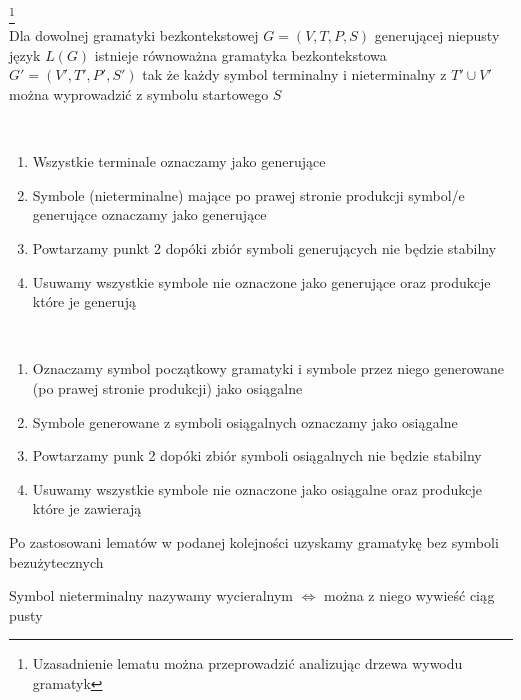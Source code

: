	\begin{lemat}\footnote{Uzasadnienie lematu można przeprowadzić analizując drzewa wywodu gramatyk}~\\
		Dla dowolnej gramatyki bezkontekstowej $G = (V, T, P, S)$ generującej niepusty język $L(G)$ istnieje równoważna gramatyka
		bezkontekstowa $G' = (V', T', P', S')$ tak że każdy symbol terminalny i nieterminalny z $T' \cup V'$ można wyprowadzić
		z  symbolu startowego $S$
	\end{lemat}		
	
	\begin{alg}~\\
		\begin{enumerate}
			\item Wszystkie terminale oznaczamy jako generujące
			\item Symbole (nieterminalne) mające po prawej stronie produkcji symbol/e generujące oznaczamy jako generujące
			\item Powtarzamy punkt 2 dopóki zbiór symboli generujących nie będzie stabilny
			\item Usuwamy wszystkie symbole nie oznaczone jako generujące oraz produkcje które je generują
		\end{enumerate}
	\end{alg}
	
	\begin{alg}~\\
		\begin{enumerate}
			\item Oznaczamy symbol początkowy gramatyki i symbole przez niego generowane (po prawej stronie produkcji)
			jako osiągalne
			\item Symbole generowane z symboli osiągalnych oznaczamy jako osiągalne
			\item Powtarzamy punk 2 dopóki zbiór symboli osiągalnych nie będzie stabilny
			\item Usuwamy wszystkie symbole nie oznaczone jako osiągalne oraz produkcje które je zawierają
		\end{enumerate}
	\end{alg}	
	
	\begin{tw}
		Po zastosowani lematów w podanej kolejności uzyskamy gramatykę bez symboli bezużytecznych
	\end{tw}
	
	\begin{df}
		Symbol nieterminalny nazywamy wycieralnym $\Leftrightarrow$ można z niego wywieść ciąg pusty
	\end{df}		

